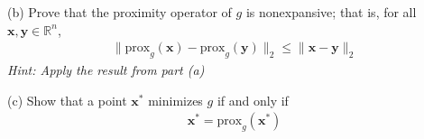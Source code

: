 \documentclass{article}
\newcommand{\R}{\mathbb{R}}
\begin{document}
\noindent
(b) Prove that the proximity operator of \(g\) is nonexpansive; that is, for all \(\bm{x}, \bm{y} \in \R^n\),
\begin{align*}
    \|\text{prox}_g (\bm{x}) - \text{prox}_g(\bm{y})\|_2 \leq \|\bm{x} - \bm{y}\|_2
\end{align*}
\textit{Hint: Apply the result from part (a)}

\noindent
(c) Show that a point \(\bm{x}^*\) minimizes \(g\) if and only if
\begin{align*}
    \bm{x}^* = \text{prox}_g(\bm{x}^*)
\end{align*}
\end{document}
